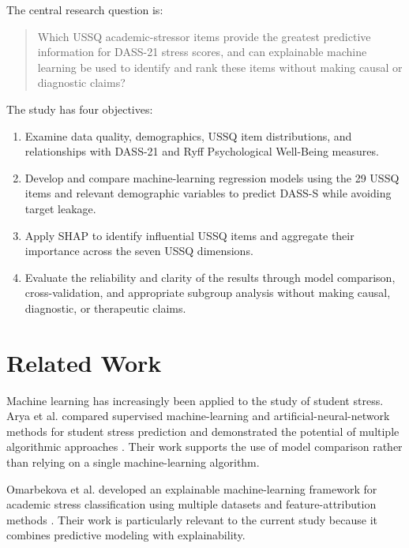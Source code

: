 \documentclass[conference]{IEEEtran}
\begin{document}
The central research question is:

\begin{quote}
Which USSQ academic-stressor items provide the greatest predictive information for DASS-21 stress scores, and can explainable machine learning be used to identify and rank these items without making causal or diagnostic claims?
\end{quote}

The study has four objectives:

\begin{enumerate}
\item Examine data quality, demographics, USSQ item distributions, and relationships with DASS-21 and Ryff Psychological Well-Being measures.
\item Develop and compare machine-learning regression models using the 29 USSQ items and relevant demographic variables to predict DASS-S while avoiding target leakage.
\item Apply SHAP to identify influential USSQ items and aggregate their importance across the seven USSQ dimensions.
\item Evaluate the reliability and clarity of the results through model comparison, cross-validation, and appropriate subgroup analysis without making causal, diagnostic, or therapeutic claims.
\end{enumerate}


\section{Related Work}

Machine learning has increasingly been applied to the study of student stress. Arya et al. compared supervised machine-learning and artificial-neural-network methods for student stress prediction and demonstrated the potential of multiple algorithmic approaches \cite{arya2024}. Their work supports the use of model comparison rather than relying on a single machine-learning algorithm.

Omarbekova et al. developed an explainable machine-learning framework for academic stress classification using multiple datasets and feature-attribution methods \cite{omarbekova2026}. Their work is particularly relevant to the current study because it combines predictive modeling with explainability.
\end{document}
